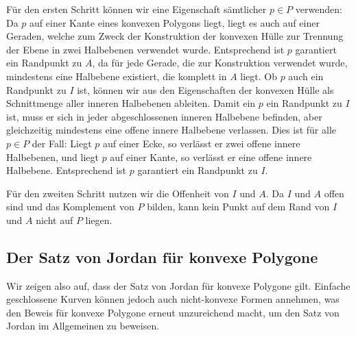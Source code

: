 Für den ersten Schritt können wir eine Eigenschaft sämtlicher $p \in P$ verwenden: Da $p$ auf einer Kante eines konvexen Polygons liegt, liegt es auch auf einer Geraden, welche zum Zweck der Konstruktion der konvexen Hülle zur Trennung der Ebene in zwei Halbebenen verwendet wurde.
Entsprechend ist $p$ garantiert ein Randpunkt zu $A$, da für jede Gerade, die zur Konstruktion verwendet wurde, mindestens eine Halbebene existiert, die komplett in $A$ liegt.
Ob $p$ auch ein Randpunkt zu $I$ ist, können wir aus den Eigenschaften der konvexen Hülle als Schnittmenge aller inneren Halbebenen ableiten.
Damit ein $p$ ein Randpunkt zu $I$ ist, muss er sich in jeder abgeschlossenen inneren Halbebene befinden, aber gleichzeitig mindestens eine offene innere Halbebene verlassen.
Dies ist für alle $p \in P$ der Fall: Liegt $p$ auf einer Ecke, so verlässt er zwei offene innere Halbebenen, und liegt $p$ auf einer Kante, so verlässt er eine offene innere Halbebene.
Entsprechend ist $p$ garantiert ein Randpunkt zu $I$.

Für den zweiten Schritt nutzen wir die Offenheit von $I$ und $A$.
Da $I$ und $A$ offen sind und das Komplement von $P$ bilden, kann kein Punkt auf dem Rand von $I$ und $A$ nicht auf $P$ liegen.

\subsection{Der Satz von Jordan für konvexe Polygone
\label{jordan:subsection:satz_von_jordan_konvexe_polygone}}

Wir zeigen also auf, dass der Satz von Jordan für konvexe Polygone gilt.
Einfache geschlossene Kurven können jedoch auch nicht-konvexe Formen annehmen, was den Beweis für konvexe Polygone erneut unzureichend macht, um den Satz von Jordan im Allgemeinen zu beweisen.
